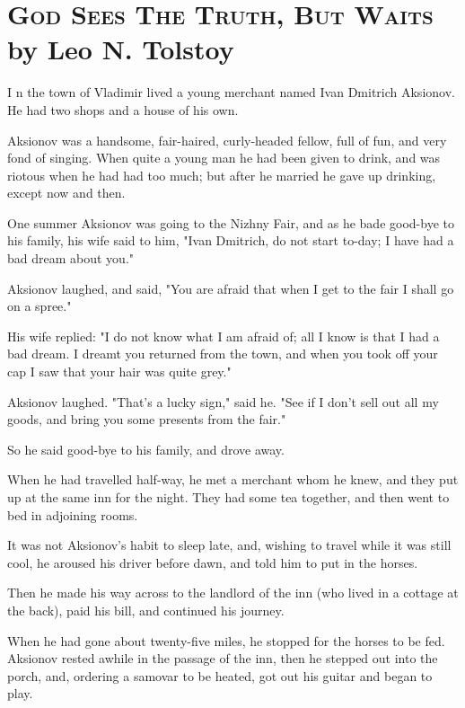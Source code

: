 \chapter{\textsc{God Sees The Truth, But Waits}\\
\small \hspace{20pt}
by Leo N. Tolstoy}


\lettrine[lines=3,lhang=0.11,lraise=0,loversize=0.05]{I}{}%
n the town of Vladimir lived a young merchant named Ivan Dmitrich
Aksionov. He had two shops and a house of his own.

Aksionov was a handsome, fair-haired, curly-headed fellow, full of
fun, and very fond of singing. When quite a young man he had been
given to drink, and was riotous when he had had too much; but after he
married he gave up drinking, except now and then.

One summer Aksionov was going to the Nizhny Fair, and as he bade
good-bye to his family, his wife said to him, "Ivan Dmitrich, do not
start to-day; I have had a bad dream about you."

Aksionov laughed, and said, "You are afraid that when I get to the
fair I shall go on a spree."

His wife replied: "I do not know what I am afraid of; all I know is
that I had a bad dream. I dreamt you returned from the town, and when
you took off your cap I saw that your hair was quite grey."

Aksionov laughed. "That's a lucky sign," said he. "See if I don't sell
out all my goods, and bring you some presents from the fair."

So he said good-bye to his family, and drove away.

When he had travelled half-way, he met a merchant whom he knew, and
they put up at the same inn for the night. They had some tea together,
and then went to bed in adjoining rooms.

It was not Aksionov's habit to sleep late, and, wishing to travel
while it was still cool, he aroused his driver before dawn, and told
him to put in the horses.

Then he made his way across to the landlord of the inn (who lived in a
cottage at the back), paid his bill, and continued his journey.

When he had gone about twenty-five miles, he stopped for the horses to
be fed. Aksionov rested awhile in the passage of the inn, then he
stepped out into the porch, and, ordering a samovar to be heated, got
out his guitar and began to play.

